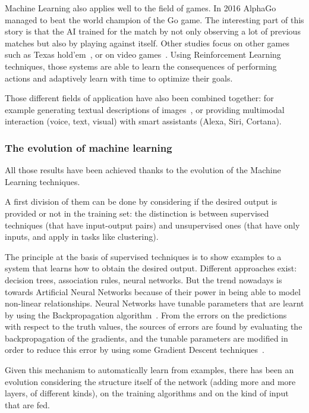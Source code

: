 Machine Learning also applies well to the field of games. In 2016 AlphaGo~\cite{chouard2016go} managed to beat the world champion of the Go game. The interesting part of this story is that the AI trained for the match by not only observing a lot of previous matches but also by playing against itself. Other studies focus on other games such as Texas hold'em~\cite{brown2017superhuman}, or on video games~\cite{mnih2015human}. Using Reinforcement Learning techniques, those systems are able to learn the consequences of performing actions and adaptively learn with time to optimize their goals.

Those different fields of application have also been combined together: for example generating textual descriptions of images~\cite{xu2015show}, or providing multimodal interaction (voice, text, visual) with smart assistants (Alexa, Siri, Cortana).

\subsubsection{The evolution of machine learning}
All those results have been achieved thanks to the evolution of the Machine Learning techniques.

A first division of them can be done by considering if the desired output is provided or not in the training set: the distinction is between supervised techniques (that have input-output pairs) and unsupervised ones (that have only inputs, and apply in tasks like clustering).

The principle at the basis of supervised techniques is to show examples to a system that learns how to obtain the desired output. Different approaches exist: decision trees, association rules, neural networks. But the trend nowadays is towards Artificial Neural Networks because of their power in being able to model non-linear relationships. Neural Networks have tunable parameters that are learnt by using the Backpropagation algorithm~\cite{rumelhart1986learning}. From the errors on the predictions with respect to the truth values, the sources of errors are found by evaluating the backpropagation of the gradients, and the tunable parameters are modified in order to reduce this error by using some Gradient Descent techniques~\cite{bottou2010large}.

Given this mechanism to automatically learn from examples, there has been an evolution considering the structure itself of the network (adding more and more layers, of different kinds), on the training algorithms and on the kind of input that are fed.

